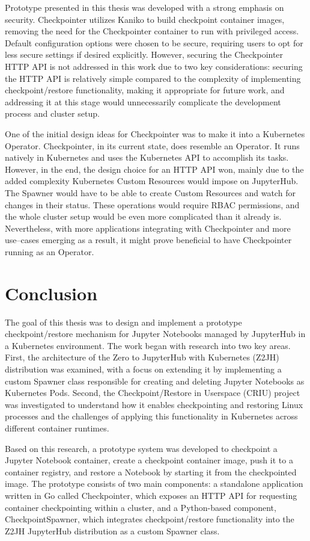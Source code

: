 \documentclass[
  digital,     %
  oneside,     %
  nosansbold,  %
  nocolorbold, %
  lof,         %
  nolot,         %
]{fithesis4}
\begin{document}
Prototype presented in this thesis was developed with a strong emphasis on security. Checkpointer utilizes Kaniko to build checkpoint container images, removing the need for the Checkpointer container to run with privileged access. Default configuration options were chosen to be secure, requiring users to opt for less secure settings if desired explicitly. However, securing the Checkpointer HTTP API is not addressed in this work due to two key considerations: securing the HTTP API is relatively simple compared to the complexity of implementing checkpoint/restore functionality, making it appropriate for future work, and addressing it at this stage would unnecessarily complicate the development process and cluster setup.

One of the initial design ideas for Checkpointer was to make it into a Kubernetes Operator. Checkpointer, in its current state, does resemble an Operator. It runs natively in Kubernetes and uses the Kubernetes API to accomplish its tasks. However, in the end, the design choice for an HTTP API won, mainly due to the added complexity Kubernetes Custom Resources would impose on JupyterHub. The Spawner would have to be able to create Custom Resources and watch for changes in their status. These operations would require RBAC permissions, and the whole cluster setup would be even more complicated than it already is. Nevertheless, with more applications integrating with Checkpointer and more use--cases emerging as a result, it might prove beneficial to have Checkpointer running as an Operator.




\chapter{Conclusion}
The goal of this thesis was to design and implement a prototype checkpoint/restore mechanism for Jupyter Notebooks managed by JupyterHub in a Kubernetes environment. The work began with research into two key areas. First, the architecture of the Zero to JupyterHub with Kubernetes (Z2JH) distribution was examined, with a focus on extending it by implementing a custom Spawner class responsible for creating and deleting Jupyter Notebooks as Kubernetes Pods. Second, the Checkpoint/Restore in Userspace (CRIU) project was investigated to understand how it enables checkpointing and restoring Linux processes and the challenges of applying this functionality in Kubernetes across different container runtimes.

Based on this research, a prototype system was developed to checkpoint a Jupyter Notebook container, create a checkpoint container image, push it to a container registry, and restore a Notebook by starting it from the checkpointed image. The prototype consists of two main components: a standalone application written in Go called Checkpointer, which exposes an HTTP API for requesting container checkpointing within a cluster, and a Python-based component, CheckpointSpawner, which integrates checkpoint/restore functionality into the Z2JH JupyterHub distribution as a custom Spawner class.
\end{document}
